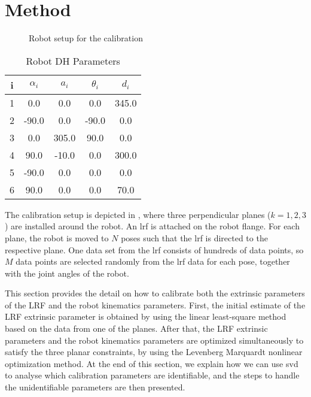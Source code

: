 \section{Method}
\label{sec:method}
\begin{figure}[t]
  \centering
  \vspace*{2mm}
  \caption{Robot setup for the calibration}
  \label{fig:robot_setup}
\end{figure}


\renewcommand{\arraystretch}{1.5}
\begin{table}[htp]
\caption{Robot DH Parameters}
\label{tab:dh_params}
\centering
\begin{tabular}{c c c c c}
\toprule
i &  \textbf{$\alpha_i$} & \textbf{$a_i$} &  \textbf{$\theta_i$}  & \textbf{$d_i$}\\
\midrule
1 & 0.0 & 0.0 & 0.0 & 345.0\\
2 & -90.0 & 0.0 & -90.0 & 0.0\\
3 & 0.0 & 305.0 & 90.0 & 0.0\\
4 & 90.0 & -10.0 & 0.0 & 300.0\\
5 & -90.0 & 0.0 & 0.0 & 0.0\\
6 & 90.0 & 0.0 & 0.0 & 70.0\\
\bottomrule
\end{tabular}
\end{table}

The calibration setup is depicted in , where three perpendicular planes ($k=1,2,3$) are installed around the robot. An \ac{lrf} is attached on the robot flange. For each plane, the robot is moved to $N$ poses such that the \ac{lrf} is directed to the respective plane. One data set from the \ac{lrf} consists of hundreds of data points, so $M$ data points are selected randomly from the \ac{lrf} data for each pose, together with the joint angles of the robot. 

This section provides the detail on how to calibrate both the extrinsic parameters of the LRF and the robot kinematics parameters. First, the initial estimate of the LRF extrinsic parameter is obtained by using the linear least-square method based on the data from one of the planes. After that, the LRF extrinsic parameters and the robot kinematics parameters are optimized simultaneously to satisfy the three planar constraints, by using the Levenberg Marquardt nonlinear optimization method. At the end of this section, we explain how we can use \ac{svd} to analyse which calibration parameters are identifiable, and the steps to handle the unidentifiable parameters are then presented. 
